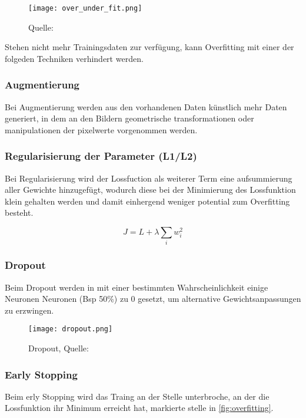 \begin{figure}[H]
    \centering
    \texttt{[image: over\_under\_fit.png]}
    \caption{Quelle: \cite{deshpGuideImprovingDeep2017a}}
    \label{fig:over_under_fit}
\end{figure}


Stehen nicht mehr Trainingsdaten zur verfügung, kann Overfitting
mit einer der folgeden Techniken verhindert werden.


\subsubsection{Augmentierung}
Bei Augmentierung werden aus den vorhandenen Daten künstlich mehr 
Daten generiert, in dem an den Bildern geometrische transformationen 
oder manipulationen der pixelwerte vorgenommen werden.

\subsubsection{Regularisierung der Parameter (L1/L2)}
Bei Regularisierung wird der Lossfuction als weiterer Term
eine aufsummierung aller Gewichte hinzugefügt,
wodurch diese bei der Minimierung des Lossfunktion 
klein gehalten werden und damit einhergend weniger potential 
zum Overfitting besteht.

\begin{equation}
    \label{eq:regularization}
    J = L + \lambda \sum_{i} w_{i}^{2}
\end{equation}

\subsubsection{Dropout}
Beim Dropout werden in mit einer bestimmten Wahrscheinlichkeit 
einige Neuronen Neuronen (Bsp 50\%) zu 0 gesetzt, um 
alternative Gewichtsanpassungen zu erzwingen.

\begin{figure}[H]
    \centering
    \texttt{[image: dropout.png]}
    \caption{Dropout, Quelle: \cite{maksutovDeepStudyNot2018}}
    \label{fig:dropout}
\end{figure}

\subsubsection{Early Stopping}
Beim erly Stopping wird das Traing an der 
Stelle unterbroche, an der die Lossfunktion ihr 
Minimum erreicht hat, markierte stelle in 
\ref{fig:overfitting}.


